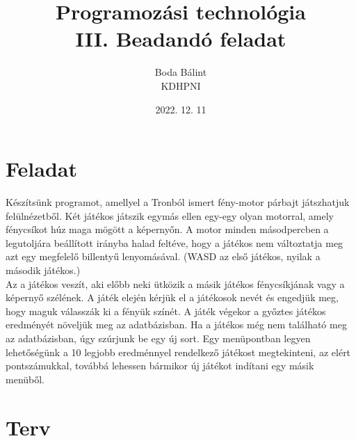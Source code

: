 \documentclass[a4paper,12pt]{article}
\title{\huge{Programozási technológia} \\ \large  III. Beadandó feladat}
\author{Boda Bálint \\ KDHPNI}
\date{2022. 12. 11}
\begin{document}
	\maketitle
	\section{Feladat}
	Készítsünk programot, amellyel a Tronból ismert fény-motor párbajt játszhatjuk felülnézetből. Két játékos játszik egymás ellen egy-egy olyan motorral, amely fénycsíkot húz maga mögött a képernyőn. A motor minden másodpercben a legutoljára beállított irányba halad feltéve, hogy a játékos nem változtatja meg azt egy megfelelő billentyű lenyomásával. (WASD az első játékos, nyilak a második játékos.)
	\\[8pt] \noindent
	Az a játékos veszít, aki előbb neki ütközik a másik játékos fénycsíkjának vagy a képernyő szélének. A játék elején kérjük el a játékosok nevét és engedjük meg, hogy maguk válasszák ki a fényük színét. A játék végekor a győztes játékos eredményét növeljük meg az adatbázisban. Ha a játékos még nem található meg az adatbázisban, úgy szúrjunk be egy új sort. Egy menüpontban legyen lehetőségünk a 10 legjobb eredménnyel rendelkező játékost megtekinteni, az elért pontszámukkal, továbbá lehessen bármikor új játékot indítani egy másik menüből.
	\newpage
	\section{Terv}
\end{document}
